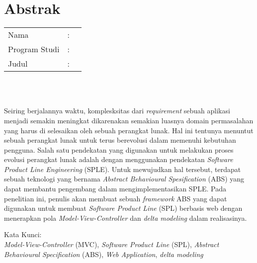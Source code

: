 %
%
%

\chapter*{Abstrak}

\vspace*{0.2cm}

\noindent \begin{tabular}{l l p{10cm}}
	Nama&: & \penulis \\
	Program Studi&: & \program \\
	Judul&: & \judul \\
\end{tabular} \\ 

\vspace*{0.5cm}

\noindent 
\\ Seiring berjalannya waktu, komplesksitas dari \textit{requirement} sebuah aplikasi menjadi semakin meningkat dikarenakan semakian luasnya domain permasalahan yang harus di selesaikan oleh sebuah perangkat lunak. Hal ini tentunya menuntut sebuah perangkat lunak untuk terus berevolusi dalam memenuhi kebutuhan pengguna. Salah satu pendekatan yang digunakan untuk melakukan proses evolusi perangkat lunak adalah dengan menggunakan pendekatan \textit{Software Product Line Engineering} (SPLE). Untuk mewujudkan hal tersebut, terdapat sebuah teknologi yang bernama \textit{Abstract Behavioural Spesification} (ABS) yang dapat membantu pengembang dalam mengimplementasikan SPLE. Pada penelitian ini, penulis akan membuat sebuah \textit{framework} ABS yang dapat digunakan untuk membuat \textit{Software Product Line} (SPL) berbasis web dengan menerapkan pola \textit{Model-View-Controller} dan \textit{delta modeling} dalam realisasinya.

\vspace*{0.2cm}

\noindent Kata Kunci: \\ 
\noindent \textit{Model-View-Controller} (MVC), \textit{Software Product Line} (SPL), \textit{Abstract Behavioural Specification} (ABS), \textit{Web Application}, \textit{delta modeling}\\

\newpage